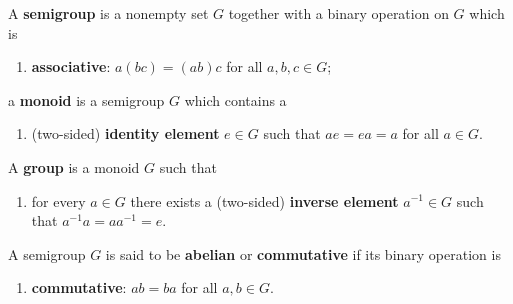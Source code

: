 \begin{definition}
A \textbf{semigroup} is a nonempty set $G$ together with a binary operation on $G$ which is
\begin{enumerate}
    \item[(i)] \textbf{associative}: $a(bc) = (ab)c$ for all $a, b, c \in G$;
\end{enumerate}
a \textbf{monoid} is a semigroup $G$ which contains a
\begin{enumerate}
    \item[(ii)] (two-sided) \textbf{identity element} $e \in G$ such that $ae = ea = a$ for all $a \in G$.
\end{enumerate}
A \textbf{group} is a monoid $G$ such that
\begin{enumerate}
    \item[(iii)] for every $a \in G$ there exists a (two-sided) \textbf{inverse element} $a^{-1} \in G$ such that $a^{-1}a = aa^{-1} = e$.
\end{enumerate}
A semigroup $G$ is said to be \textbf{abelian} or \textbf{commutative} if its binary operation is
\begin{enumerate}
    \item[(iv)] \textbf{commutative}: $ab = ba$ for all $a,b \in G$.
\end{enumerate}
\end{definition}
